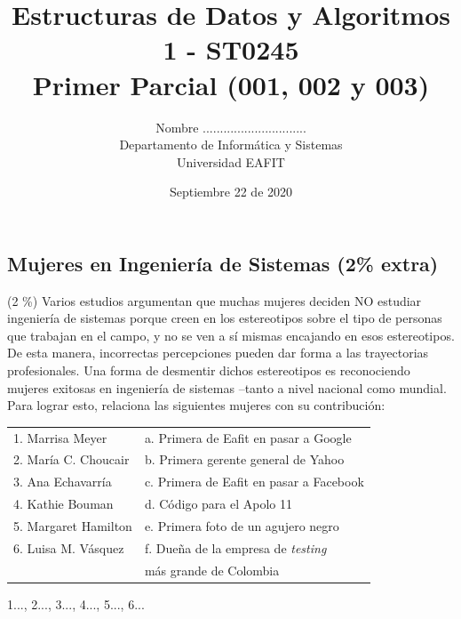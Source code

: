 \documentclass[10 pt]{article}
\title{\textbf {Estructuras de Datos y Algoritmos 1 - ST0245\\Primer Parcial (001, 002 y 003)}}
\author{Nombre ..............................\\
		Departamento de Informática y Sistemas\\
		Universidad EAFIT\\}
\date{Septiembre 22 de 2020}
\begin{document}
\lstset{language=Java,frame=none, breaklines=true, numbers = left, stepnumber = 1, xleftmargin=5.0ex, showstringspaces=false, showspaces=false }
\lstset{language=Python,frame=none, breaklines=true, numbers = left, stepnumber = 1, xleftmargin=5.0ex, showstringspaces=false,showspaces=false }
\maketitle
\begin{multicols}{2}

\section{Mujeres en Ingeniería de Sistemas (2\% extra)}
 (2 \%) Varios estudios argumentan que muchas mujeres deciden NO estudiar ingeniería de sistemas porque creen en los estereotipos sobre el tipo de personas que trabajan en el campo, y no se ven a sí mismas encajando en esos estereotipos. De esta manera, incorrectas percepciones pueden dar forma a las trayectorias profesionales. Una forma de desmentir dichos estereotipos es reconociendo mujeres exitosas en ingeniería de sistemas --tanto a nivel nacional como mundial. Para lograr esto, relaciona las siguientes mujeres con su contribución:

{\footnotesize
\begin{tabular}{l l}
1. Marrisa Meyer &  a. Primera de Eafit en pasar a Google\\
2. María C. Choucair &  b. Primera gerente general de Yahoo \\
3. Ana Echavarría &  c. Primera de Eafit en pasar a Facebook \\
4. Kathie Bouman &  d. Código para el Apolo 11\\
5. Margaret Hamilton  & e. Primera foto de un agujero negro\\
6. Luisa M. Vásquez  &  f. Dueña de la empresa de \emph{testing} \\
& más grande de Colombia
 \end{tabular}
 }

1..., 2..., 3..., 4..., 5..., 6...


\end{multicols}
\end{document}
